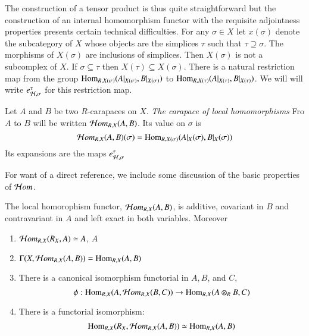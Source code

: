 The construction of a tensor product is thus quite straightforward but the construction of an internal homomorphism functor with the requisite adjointness properties presents certain technical difficulties. For any $\sigma \in X$ let $x(\sigma)$ denote the subcategory of $X$ whose objects are the simplices $\tau$ such that $\tau \supseteq \sigma$. The morphisms of $X(\sigma)$ are inclusions of simplices. Then $X(\sigma)$ is not a subcomplex of $X$. If $\sigma \subseteq \tau$ then $X(\tau) \subseteq X(\sigma)$. There is a natural restriction map from the group $\operatorname{Hom}_{R, X (\sigma)}(A|_{X(\sigma)}, B|_{X(\sigma)})$ to $\operatorname{Hom}_{R, X(\tau)}(A|_{X(\tau)}, B|_{X(\tau)})$. We will will write $e_{\mathcal{H}, \sigma}^{\tau}$ for this restriction map.

\begin{definition}\label{art6-definition-2.3}
Let $A$ and $B$ be two $R$-carapaces on $X$. \textit{The carapace of local homomorphisms} Fro  $A$ to $B$ will be written $\mathcal{H} om_{R, X}(A, B)$. Its value on $\sigma$ is
$$
\mathcal{H} om_{R, X}(A, B)(\sigma) = \operatorname{Hom}_{R, X(\sigma)}(A|_{X}(\sigma), B|_{X}(\sigma))
$$
Its expansions are the maps $e_{\mathcal{H}, \sigma}^{\tau}$
\end{definition}

For want of a direct reference, we include some discussion of the basic properties of $\mathcal{H} om$.

\begin{theorem}\label{art6-thm-2.4}
The local homorophism functor, $\mathcal{H} om_{R, X}(A, B)$, is additive, covariant in $B$ and contravariant in $A$ and left exact in both variables. Moreover
    \begin{enumerate}[(1)]
    \item $\mathcal{H} om_{R, X}(R_{X}, A)\simeq A$,  $A$\label{art6-thm2.4-enum-(1)}
    \item $\Gamma(X, \mathcal{H} om_{R,X}(A, B)) = \operatorname{Hom}_{R,X}(A, B)$\label{art6-thm2.4-enum-(2)}
    \item There is a canonical isomorphism functorial in $A, B$, and $C$,\label{art6-thm2.4-enum-(3)}
        $$
        \phi : \operatorname{Hom}_{R, X}(A, \mathcal{H} om_{R, X}(B, C))\rightarrow \operatorname{Hom}_{R, X}(A \otimes_{R} B, C)
        $$
    \item There is a functorial isomorphism:\label{art6-thm2.4-enum-(4)}
    $$
    \operatorname{Hom}_{R, X}(R_{X}, \mathcal{H} om_{R, X}(A, B)) \simeq \operatorname{Hom}_{R, X}(A, B)
    $$  
    \end{enumerate}
\end{theorem}

